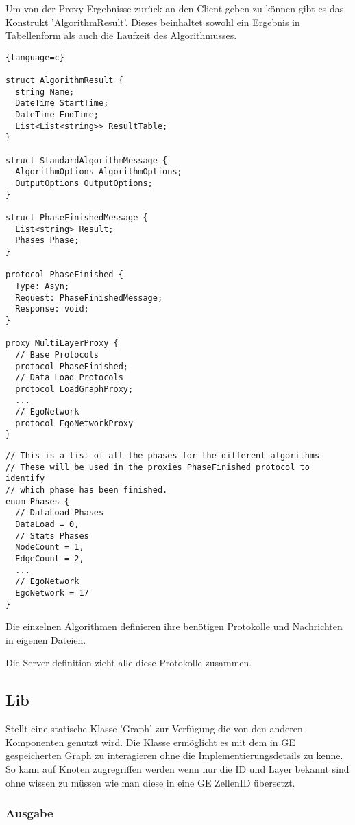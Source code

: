 Um von der Proxy Ergebnisse zurück an den Client geben zu können gibt es das Konstrukt 'AlgorithmResult'. Dieses beinhaltet sowohl ein Ergebnis in Tabellenform als auch die Laufzeit des Algorithmusses.


\begin{lstlisting}{language=c}

struct AlgorithmResult {
  string Name;
  DateTime StartTime;
  DateTime EndTime;
  List<List<string>> ResultTable;
}

struct StandardAlgorithmMessage {
  AlgorithmOptions AlgorithmOptions;
  OutputOptions OutputOptions;
}

struct PhaseFinishedMessage {
  List<string> Result;
  Phases Phase;
}

protocol PhaseFinished {
  Type: Asyn;
  Request: PhaseFinishedMessage;
  Response: void;
}

proxy MultiLayerProxy {
  // Base Protocols
  protocol PhaseFinished;
  // Data Load Protocols
  protocol LoadGraphProxy;
  ...
  // EgoNetwork
  protocol EgoNetworkProxy
}
\end{lstlisting}


\begin{lstlisting}
// This is a list of all the phases for the different algorithms
// These will be used in the proxies PhaseFinished protocol to identify
// which phase has been finished.
enum Phases {
  // DataLoad Phases
  DataLoad = 0,
  // Stats Phases
  NodeCount = 1,
  EdgeCount = 2,
  ...
  // EgoNetwork
  EgoNetwork = 17
}
\end{lstlisting}


Die einzelnen Algorithmen definieren ihre benötigen Protokolle und Nachrichten in eigenen Dateien. 

Die Server definition zieht alle diese Protokolle zusammen. 


\subsection{Lib}


Stellt eine statische Klasse 'Graph' zur Verfügung die von den anderen Komponenten genutzt wird. Die Klasse ermöglicht es mit dem in GE gespeicherten Graph zu interagieren ohne die Implementierungsdetails zu kenne. So kann auf Knoten zugregriffen werden wenn nur die ID und Layer bekannt sind ohne wissen zu müssen wie man diese in eine GE ZellenID übersetzt.


\subsubsection{Ausgabe}

